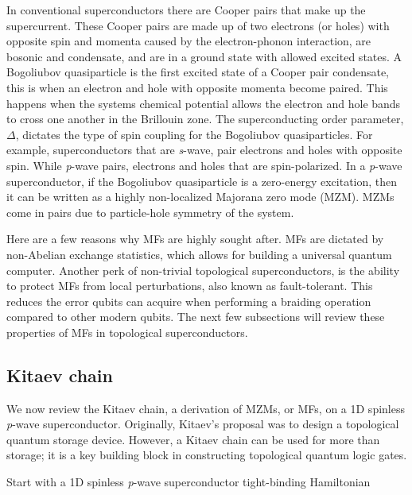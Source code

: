 In conventional superconductors there are Cooper pairs that make up the supercurrent.
These Cooper pairs are made up of two electrons (or holes) with opposite spin and momenta caused by the electron-phonon interaction, are bosonic and condensate, and are in a ground state with allowed excited states.
A Bogoliubov quasiparticle is the first excited state of a Cooper pair condensate, this is when an electron and hole with opposite momenta become paired.
This happens when the systems chemical potential allows the electron and hole bands to cross one another in the Brillouin zone.
The superconducting order parameter, $\Delta$, dictates the type of spin coupling for the Bogoliubov quasiparticles.
For example, superconductors that are \textit{s}-wave, pair electrons and holes with opposite spin.
While \textit{p}-wave pairs, electrons and holes that are spin-polarized.
In a \textit{p}-wave superconductor, if the Bogoliubov quasiparticle is a zero-energy excitation, then it can be written as a highly non-localized Majorana zero mode (MZM).
MZMs come in pairs due to particle-hole symmetry of the system.

Here are a few reasons why MFs are highly sought after.
MFs are dictated by non-Abelian exchange statistics, which allows for building a universal quantum computer.
Another perk of non-trivial topological superconductors, is the ability to protect MFs from local perturbations, also known as fault-tolerant.
This reduces the error qubits can acquire when performing a braiding operation compared to other modern qubits.
The next few subsections will review these properties of MFs in topological superconductors.


\subsection{Kitaev chain}
We now review the Kitaev chain, a derivation of MZMs, or MFs, on a 1D spinless \textit{p}-wave superconductor.
Originally, Kitaev's proposal was to design a topological quantum storage device.
However, a Kitaev chain can be used for more than storage; it is a key building block in constructing topological quantum logic gates.

Start with a 1D spinless \textit{p}-wave superconductor tight-binding Hamiltonian

